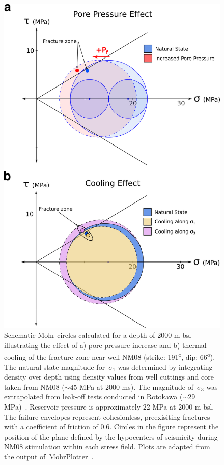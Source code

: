 \begin{figure}[h!]
\begin{center}
\includegraphics[width=0.70\columnwidth]{Chapter_3_Nga/figures/Nga_2000mbsl_NM08_fz_schematic/Nga_2000mbsl_NM08_fz_schematic_original.png}
\caption{{Schematic Mohr circles calculated for a depth of 2000 m bsl illustrating
the effect of a) pore pressure increase and b) thermal cooling of the
fracture zone near well NM08 (strike: 191\textsuperscript{o}, dip:
66\textsuperscript{o}). The natural state magnitude
for~\(\sigma_{1}\) was determined by integrating density over depth
using density values from well cuttings and core taken from NM08
($\sim$45 MPa at 2000 ms). The magnitude
of~\(\sigma_{3}\) was extrapolated from leak-off tests conducted in
Rotokawa ($\sim$29 MPa)~\protect\citep{davidson_2012}. Reservoir
pressure is approximately 22 MPa at 2000 m bsl. The failure envelopes
represent cohesionless, preexisiting fractures with a coefficient of
friction of 0.6. Circles in the figure represent the position of the
plane defined by the hypocenters of seismicity during NM08 stimulation
within each stress field. Plots are adapted from the output
of~\href{http://www.geo.cornell.edu/geology/faculty/RWA/programs/mohrplotter.html}{MohrPlotter}~\protect\citep{Allmendinger}.
{\label{111394}}%
}}
\end{center}
\end{figure}

